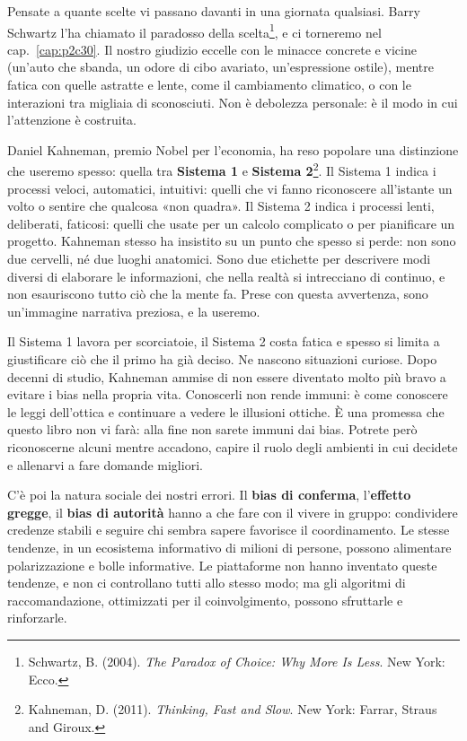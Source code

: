 Pensate a quante scelte vi passano davanti in una giornata qualsiasi. Barry Schwartz l'ha chiamato il paradosso della scelta\footnote{Schwartz, B. (2004). \textit{The Paradox of Choice: Why More Is Less}. New York: Ecco.}, e ci torneremo nel cap.~\ref{cap:p2c30}. Il nostro giudizio eccelle con le minacce concrete e vicine (un'auto che sbanda, un odore di cibo avariato, un'espressione ostile), mentre fatica con quelle astratte e lente, come il cambiamento climatico, o con le interazioni tra migliaia di sconosciuti. Non è debolezza personale: è il modo in cui l'attenzione è costruita.

Daniel Kahneman, premio Nobel per l'economia, ha reso popolare una distinzione che useremo spesso: quella tra \textbf{Sistema 1} e \textbf{Sistema 2}\footnote{Kahneman, D. (2011). \textit{Thinking, Fast and Slow}. New York: Farrar, Straus and Giroux.}. Il Sistema 1 indica i processi veloci, automatici, intuitivi: quelli che vi fanno riconoscere all'istante un volto o sentire che qualcosa «non quadra». Il Sistema 2 indica i processi lenti, deliberati, faticosi: quelli che usate per un calcolo complicato o per pianificare un progetto. Kahneman stesso ha insistito su un punto che spesso si perde: non sono due cervelli, né due luoghi anatomici. Sono due etichette per descrivere modi diversi di elaborare le informazioni, che nella realtà si intrecciano di continuo, e non esauriscono tutto ciò che la mente fa. Prese con questa avvertenza, sono un'immagine narrativa preziosa, e la useremo.

Il Sistema 1 lavora per scorciatoie, il Sistema 2 costa fatica e spesso si limita a giustificare ciò che il primo ha già deciso. Ne nascono situazioni curiose. Dopo decenni di studio, Kahneman ammise di non essere diventato molto più bravo a evitare i bias nella propria vita. Conoscerli non rende immuni: è come conoscere le leggi dell'ottica e continuare a vedere le illusioni ottiche. È una promessa che questo libro non vi farà: alla fine non sarete immuni dai bias. Potrete però riconoscerne alcuni mentre accadono, capire il ruolo degli ambienti in cui decidete e allenarvi a fare domande migliori.

C'è poi la natura sociale dei nostri errori. Il \textbf{bias di conferma}, l'\textbf{effetto gregge}, il \textbf{bias di autorità} hanno a che fare con il vivere in gruppo: condividere credenze stabili e seguire chi sembra sapere favorisce il coordinamento. Le stesse tendenze, in un ecosistema informativo di milioni di persone, possono alimentare polarizzazione e bolle informative. Le piattaforme non hanno inventato queste tendenze, e non ci controllano tutti allo stesso modo; ma gli algoritmi di raccomandazione, ottimizzati per il coinvolgimento, possono sfruttarle e rinforzarle.

